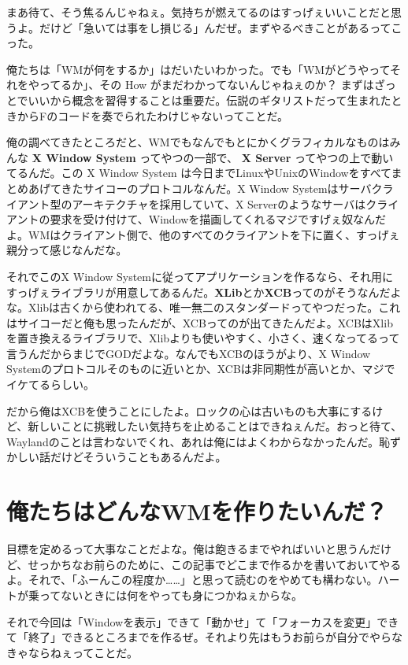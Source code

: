 \documentclass[12pt,a4paper]{jsarticle}
\begin{document}
まあ待て、そう焦るんじゃねぇ。気持ちが燃えてるのはすっげぇいいことだと思うよ。だけど「急いては事をし損じる」んだぜ。まずやるべきことがあるってこった。

俺たちは「WMが何をするか」はだいたいわかった。でも「WMがどうやってそれをやってるか」、その How がまだわかってないんじゃねぇのか？ まずはざっとでいいから概念を習得することは重要だ。伝説のギタリストだって生まれたときからFのコードを奏でられたわけじゃないってことだ。

俺の調べてきたところだと、WMでもなんでもとにかくグラフィカルなものはみんな \textbf{X Window System} ってやつの一部で、 \textbf{X Server} ってやつの上で動いてるんだ。この X Window System は今日までLinuxやUnixのWindowをすべてまとめあげてきたサイコーのプロトコルなんだ。X Window Systemはサーバクライアント型のアーキテクチャを採用していて、X Serverのようなサーバはクライアントの要求を受け付けて、Windowを描画してくれるマジですげぇ奴なんだよ。WMはクライアント側で、他のすべてのクライアントを下に置く、すっげぇ親分って感じなんだな。

それでこのX Window Systemに従ってアプリケーションを作るなら、それ用にすっげぇライブラリが用意してあるんだ。\textbf{XLib}とか\textbf{XCB}ってのがそうなんだよな。Xlibは古くから使われてる、唯一無二のスタンダードってやつだった。これはサイコーだと俺も思ったんだが、XCBってのが出てきたんだよ。XCBはXlibを置き換えるライブラリで、Xlibよりも使いやすく、小さく、速くなってるって言うんだからまじでGODだよな。なんでもXCBのほうがより、X Window Systemのプロトコルそのものに近いとか、XCBは非同期性が高いとか、マジでイケてるらしい。

だから俺はXCBを使うことにしたよ。ロックの心は古いものも大事にするけど、新しいことに挑戦したい気持ちを止めることはできねぇんだ。おっと待て、Waylandのことは言わないでくれ、あれは俺にはよくわからなかったんだ。恥ずかしい話だけどそういうこともあるんだよ。

\section{俺たちはどんなWMを作りたいんだ？}

目標を定めるって大事なことだよな。俺は飽きるまでやればいいと思うんだけど、せっかちなお前らのために、この記事でどこまで作るかを書いておいてやるよ。それで、「ふーんこの程度か……」と思って読むのをやめても構わない。ハートが乗ってないときには何をやっても身につかねぇからな。

それで今回は「Windowを表示」できて「動かせ」て「フォーカスを変更」できて「終了」できるところまでを作るぜ。それより先はもうお前らが自分でやらなきゃならねぇってことだ。
\end{document}
